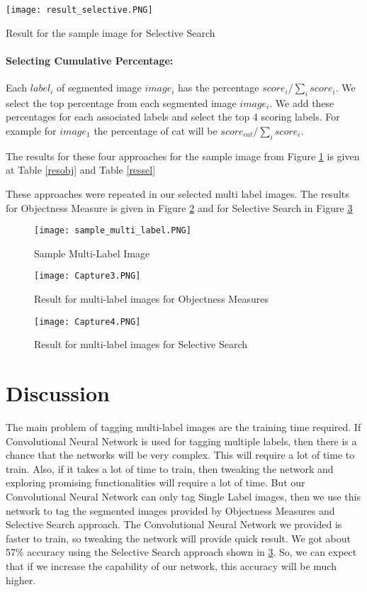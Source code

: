 \begin{table}[!htb]
\centering
  \texttt{[image: result\_selective.PNG]}
  \caption{Result for the sample image for Selective Search}
  \label{ressel}
\end{table}

\paragraph{Selecting Cumulative Percentage:}
Each $label_{i}$ of segmented image $image_{i}$ has the percentage $score_{i} / \sum_{i}{score_{i}}$. We select the top percentage from each segmented image $image_{i}$. We add these percentages for each associated labels and select the top 4 scoring labels. For example for $image_{1}$ the percentage of cat will be $score_{cat} / \sum_{i}{score_{i}}$.\hfill \break

The results for these four approaches for the sample image from Figure \ref{sample_multi_label} is given at Table \ref{resobj} and Table \ref{ressel} \hfill \break


These approaches were repeated in our selected multi label images. The results for Objectness Measure is given in Figure \ref{finobj} and for Selective Search in Figure  \ref{finsel}

\begin{figure}[h!]
  \centering
  \texttt{[image: sample\_multi\_label.PNG]}
  \caption{Sample Multi-Label Image}\label{sample_multi_label}
\end{figure}


\begin{figure}[h!]
  \centering
  \texttt{[image: Capture3.PNG]}
  \caption{Result for multi-label images for Objectness Measures}\label{finobj}
\end{figure}


\begin{figure}[h!]
  \centering
  \texttt{[image: Capture4.PNG]}
  \caption {Result for multi-label images for Selective Search}\label{finsel}
\end{figure}

\section{Discussion}

The main problem of tagging multi-label images are the training time required. If Convolutional Neural Network is used for tagging multiple labels, then there is a chance that the networks will be very complex. This will require a lot of time to train. Also, if it takes a lot of time to train, then tweaking the network and exploring promising functionalities will require a lot of time. But our Convolutional Neural Network can only tag Single Label images, then we use this network to tag the segmented images provided by Objectness Measures and Selective Search approach. The Convolutional Neural Network we provided is faster to train, so tweaking the network will provide quick result. We got about 57\% accuracy using the Selective Search approach shown in \ref{finsel}. So, we can expect that if we increase the capability of our network, this accuracy will be much higher.

